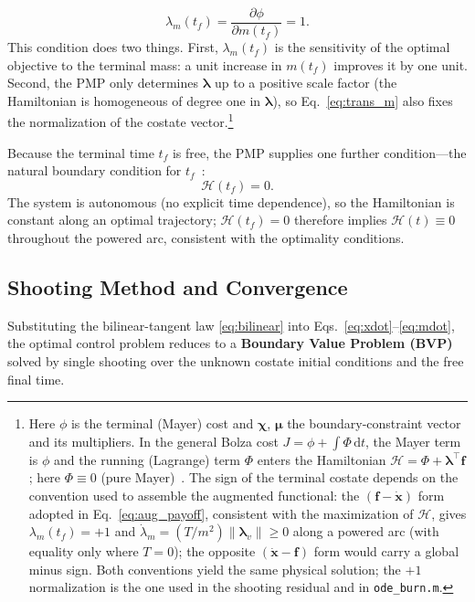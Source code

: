 \documentclass[../main.tex]{subfiles}
\begin{document}
\begin{equation}
    \lambda_m(t_f) = \frac{\partial \phi}{\partial m(t_f)} = 1.
    \label{eq:trans_m}
\end{equation}
This condition does two things. First, $\lambda_m(t_f)$ is the sensitivity of the optimal objective to the terminal mass: a unit increase in $m(t_f)$ improves it by one unit. Second, the PMP only determines $\boldsymbol{\lambda}$ up to a positive scale factor (the Hamiltonian is homogeneous of degree one in $\boldsymbol{\lambda}$), so Eq.~\eqref{eq:trans_m} also fixes the normalization of the costate vector.\footnote{Here $\phi$ is the terminal (Mayer) cost and $\boldsymbol{\chi}$, $\boldsymbol{\mu}$ the boundary-constraint vector and its multipliers. In the general Bolza cost $J = \phi + \int \Phi\,\mathrm{d}t$, the Mayer term is $\phi$ and the running (Lagrange) term $\Phi$ enters the Hamiltonian $\mathcal{H} = \Phi + \boldsymbol{\lambda}^\top\mathbf{f}$; here $\Phi \equiv 0$ (pure Mayer)~\cite[Lecture~7]{dclvnotes}. The sign of the terminal costate depends on the convention used to assemble the augmented functional: the $(\mathbf{f}-\dot{\mathbf{x}})$ form adopted in Eq.~\eqref{eq:aug_payoff}, consistent with the maximization of $\mathcal{H}$, gives $\lambda_m(t_f) = +1$ and $\dot{\lambda}_m = (T/m^2)\|\boldsymbol{\lambda}_v\| \ge 0$ along a powered arc (with equality only where $T = 0$); the opposite $(\dot{\mathbf{x}}-\mathbf{f})$ form would carry a global minus sign. Both conventions yield the same physical solution; the $+1$ normalization is the one used in the shooting residual and in \texttt{ode\_burn.m}.}

Because the terminal time $t_f$ is free, the PMP supplies one further condition---the natural boundary condition for $t_f$~\cite[Ch.~2]{bryson1975}:
\begin{equation}
    \mathcal{H}(t_f) = 0.
    \label{eq:trans_tf}
\end{equation}
The system is autonomous (no explicit time dependence), so the Hamiltonian is constant along an optimal trajectory; $\mathcal{H}(t_f) = 0$ therefore implies $\mathcal{H}(t) \equiv 0$ throughout the powered arc, consistent with the optimality conditions.

\subsection{Shooting Method and Convergence}\label{sec:shooting}

Substituting the bilinear-tangent law \eqref{eq:bilinear} into Eqs.~\eqref{eq:xdot}--\eqref{eq:mdot}, the optimal control problem reduces to a \textbf{Boundary Value Problem (BVP)} solved by single shooting over the unknown costate initial conditions and the free final time.
\end{document}
